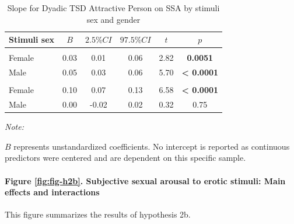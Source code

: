 \documentclass[
  bookmarksnumbered]{article}
\begin{document}
\begin{table}[H]
\centering
\caption{\label{tab:unnamed-chunk-23}Slope for Dyadic TSD Attractive Person on SSA by stimuli sex and gender}
\centering
\begin{threeparttable}
\begin{tabular}[t]{lccccc}
\toprule
Stimuli sex & $B$ & $2.5\% CI$ & $97.5\% CI$ & $t$ & $p$\\
\midrule
\addlinespace[0.3em]
\multicolumn{6}{l}{\cellcolor{lightgray}{Gender: Women}}\\
\hspace{1em}Female & 0.03 & 0.01 & 0.06 & 2.82 & \textbf{0.0051}\\
\hspace{1em}Male & 0.05 & 0.03 & 0.06 & 5.70 & \textbf{< 0.0001}\\
\addlinespace[0.3em]
\multicolumn{6}{l}{\cellcolor{lightgray}{Gender: Men}}\\
\hspace{1em}Female & 0.10 & 0.07 & 0.13 & 6.58 & \textbf{< 0.0001}\\
\hspace{1em}Male & 0.00 & -0.02 & 0.02 & 0.32 & 0.75\\
\bottomrule
\end{tabular}
\begin{tablenotes}[para]
\item \textit{Note: } 
\item $B$ represents unstandardized coefficients. No intercept is reported as 
    continuous predictors were centered and are dependent on this specific sample.
\end{tablenotes}
\end{threeparttable}
\end{table}

\paragraph{Figure \ref{fig:fig-h2b}. Subjective sexual arousal to erotic stimuli: Main effects and interactions}\label{figure-reffigfig-h2b.-subjective-sexual-arousal-to-erotic-stimuli-main-effects-and-interactions}

This figure summarizes the results of hypothesis 2b.
\end{document}
